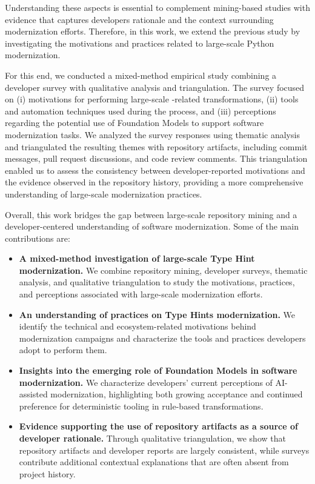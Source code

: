 Understanding these aspects is essential to complement mining-based studies with evidence that captures developers rationale and the context surrounding modernization efforts. Therefore, in this work, we extend the previous study by investigating the motivations and practices related to large-scale Python modernization.

For this end, we conducted a mixed-method empirical study combining a developer survey with qualitative analysis and triangulation. The survey focused on (i) motivations for performing large-scale \ths-related transformations, (ii) tools and automation techniques used during the process, and (iii) perceptions regarding the potential use of Foundation Models to support software modernization tasks. We analyzed the survey responses using thematic analysis and triangulated the resulting themes with repository artifacts, including commit messages, pull request discussions, and code review comments. This triangulation enabled us to assess the consistency between developer-reported motivations and the evidence observed in the repository history, providing a more comprehensive understanding of large-scale modernization practices.

Overall, this work bridges the gap between large-scale repository mining and a developer-centered understanding of software modernization. Some of the main contributions are:

\begin{itemize}
    \item \textbf{A mixed-method investigation of large-scale Type Hint modernization.} We combine repository mining, developer surveys, thematic analysis, and qualitative triangulation to study the motivations, practices, and perceptions associated with large-scale modernization efforts.

    \item \textbf{An understanding of practices on Type Hints modernization.} We identify the technical and ecosystem-related motivations behind modernization campaigns and characterize the tools and practices developers adopt to perform them.

    \item \textbf{Insights into the emerging role of Foundation Models in software modernization.} We characterize developers' current perceptions of AI-assisted modernization, highlighting both growing acceptance and continued preference for deterministic tooling in rule-based transformations.

    \item \textbf{Evidence supporting the use of repository artifacts as a source of developer rationale.} Through qualitative triangulation, we show that repository artifacts and developer reports are largely consistent, while surveys contribute additional contextual explanations that are often absent from project history.
\end{itemize}

